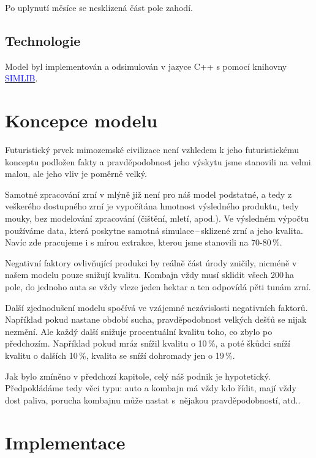 \documentclass[a4paper, 11pt, hidelinks]{article}
\begin{document}
Po uplynutí měsíce se nesklizená část pole zahodí.

\subsection{Technologie}\label{1.1_technologie}
Model byl implementován a odsimulován v jazyce C++ s pomocí knihovny \href{https://www.fit.vutbr.cz/~peringer/SIMLIB/}{\textcolor{blue}{SIMLIB}}.

\section{Koncepce modelu}\label{2_koncepce}

Futuristický prvek mimozemské civilizace není vzhledem k jeho futuristickému konceptu podložen fakty a pravděpodobnost jeho výskytu jsme stanovili na velmi malou, ale jeho vliv je poměrně velký.

Samotné zpracování zrní v mlýně již není pro náš model podstatné, a tedy z veškerého dostupného zrní je vypočítána hmotnost výsledného produktu, tedy mouky, bez modelování zpracování (čištění, mletí, apod.).
Ve výsledném výpočtu používáme data, která poskytne samotná simulace\,--\,sklizené zrní a jeho kvalita.
Navíc zde pracujeme i s mírou extrakce, kterou jsme stanovili na 70-80\,\%\cite{Alhendi2021}.

Negativní faktory ovlivňující produkci by reálně část úrody zničily, nicméně v našem modelu pouze snižují kvalitu.
Kombajn vždy musí sklidit všech 200\,ha pole, do jednoho auta se vždy vleze jeden hektar a ten odpovídá pěti tunám zrní.

Další zjednodušení modelu spočívá ve vzájemné nezávislosti negativních faktorů.
Například pokud nastane období sucha, pravděpodobnost velkých dešťů se nijak nezmění.
Ale každý další snižuje procentuální kvalitu toho, co zbylo po předchozím.
Například pokud mráz snížil kvalitu o 10\,\%, a poté škůdci sníží kvalitu o dalších 10\,\%, kvalita se sníží dohromady jen o 19\,\%.

Jak bylo zmíněno v předchozí kapitole, celý náš podnik je hypotetický.
Předpokládáme tedy věci typu: auto a kombajn má vždy kdo řídit, mají vždy dost paliva, porucha kombajnu může nastat s~nějakou pravděpodobností, atd..

\section{Implementace}\label{3_implementace}
\end{document}
